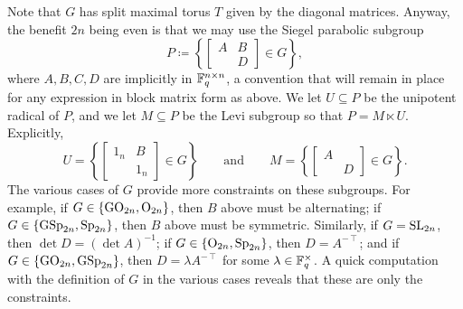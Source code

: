 Note that $G$ has split maximal torus $T$ given by the diagonal matrices. Anyway, the benefit $2n$ being even is that we may use the Siegel parabolic subgroup
\[P\coloneqq\left\{\begin{bmatrix}
    A & B \\
      & D
\end{bmatrix}\in G\right\},\]
where $A,B,C,D$ are implicitly in $\mathbb F_q^{n\times n}$, a convention that will remain in place for any expression in block matrix form as above. We let $U\subseteq P$ be the unipotent radical of $P$, and we let $M\subseteq P$ be the Levi subgroup so that $P=M\ltimes U$. Explicitly,
\[U=\left\{\begin{bmatrix}
    1_n & B \\
      & 1_n
\end{bmatrix}\in G\right\}\qquad\text{and}\qquad M=\left\{\begin{bmatrix}
    A &   \\
      & D
\end{bmatrix}\in G\right\}.\]
The various cases of $G$ provide more constraints on these subgroups. For example, if $G\in\{\mathrm{GO}_{2n},\mathrm{O}_{2n}\}$, then $B$ above must be alternating; if $G\in\{\mathrm{GSp}_{2n},\mathrm{Sp}_{2n}\}$, then $B$ above must be symmetric. Similarly, if $G=\mathrm{SL}_{2n}$, then $\det D=(\det A)^{-1}$; if $G\in\{\mathrm{O}_{2n},\mathrm{Sp}_{2n}\}$, then $D=A^{-\intercal}$; and if $G\in\{\mathrm{GO}_{2n},\mathrm{GSp}_{2n}\}$, then $D=\lambda A^{-\intercal}$ for some $\lambda\in\mathbb F_q^\times$. A quick computation with the definition of $G$ in the various cases reveals that these are only the constraints.

